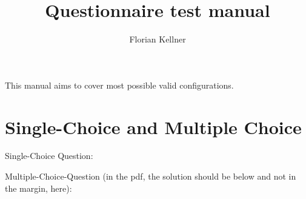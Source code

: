 \documentclass{article}
\newcommand{\sectionNewpage}{}
\newcommand{\preDoc}{}
\newcommand{\Smaller}[1]{\textsmaller{#1}}
\newlength{\stabLeft}
\newcommand{\atItemizeStart}[0]{\addtolength{\stabLeft}{\labelsep}
                                \addtolength{\stabLeft}{\labelwidth}}
\newcommand{\SVInsetPreSkip}{\vskip\abovedisplayskip}
\newcommand{\SVInsetPostSkip}{\vskip\belowdisplayskip}
\newenvironment{SVInsetFlow}{\SVInsetPreSkip\begin{list}{}{\topsep=0pt\partopsep=0pt%
\listparindent=0pt\itemindent=0pt\labelwidth=0pt\leftmargin=0pt\rightmargin=0pt%
\itemsep=0pt\parsep=0pt}\item}{\end{list}\SVInsetPostSkip}
\newcommand{\refpara}[1]{\normalmarginpar\marginpar{\raggedright \footnotesize #1}}
\newenvironment{refcolumn}{}{}
\newenvironment{refcontent}{}{}
\newcommand{\titleAndEmptyVersionAndAuthors}[3]{\title{#1}\author{#3}\maketitle}
\newcommand{\SAuthor}[1]{#1}
\newcommand{\SNumberOfAuthors}[1]{}
\let\SOriginalthesubsection\thesubsection
\newcommand{\Ssection}[2]{\section[#1]{#2}\let\thesubsection\SOriginalthesubsection}
\renewcommand{\sectionNewpage}{\newpage}
\renewcommand{\preDoc}{\sloppy}
\begin{document}
\preDoc
\titleAndEmptyVersionAndAuthors{Questionnaire test manual}{}{\SNumberOfAuthors{1}\SAuthor{Florian Kellner}}
\label{t:x28part_x22Questionnairex5ftestx5fmanualx22x29}



This manual aims to cover most possible valid configurations.

\newpage \tableofcontents \newpage

\sectionNewpage

\Ssection{Single{-}Choice and Multiple Choice}{Single{-}Choice and Multiple Choice}\label{t:x28part_x22Singlex2dChoicex5fandx5fMultiplex5fChoicex22x29}

Single{-}Choice Question:


Multiple{-}Choice{-}Question (in the pdf, the solution should be below and not in the margin, here):
\end{document}
